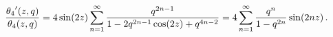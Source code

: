 \[\frac{\mathop{\theta_{4}\/}\nolimits'\!\left(z,q\right)}{\mathop{\theta_{4}\/}%
\nolimits\!\left(z,q\right)}=4\mathop{\sin\/}\nolimits\!\left(2z\right)\sum_{n%
=1}^{\infty}\frac{q^{2n-1}}{1-2q^{2n-1}\mathop{\cos\/}\nolimits\!\left(2z%
\right)+q^{4n-2}}=4\sum_{n=1}^{\infty}\frac{q^{n}}{1-q^{2n}}\mathop{\sin\/}%
\nolimits\!\left(2nz\right).\]